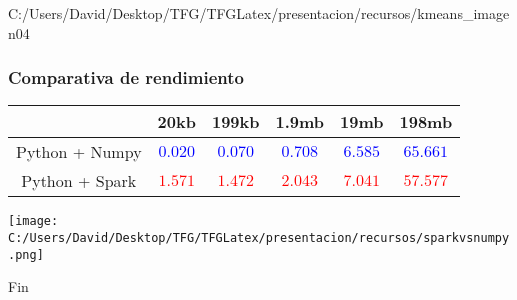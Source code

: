 \documentclass{beamer}
\begin{document}

\begin{frame} %
  {C:/Users/David/Desktop/TFG/TFGLatex/presentacion/recursos/kmeans_imagen}{0}{4}
\end{frame}


\begin{frame}[fragile] %
\frametitle{Comparativa de rendimiento}

\begin{table}[!htbp]\small
  \centering
  \begin{tabular}{|c|c|c|c|c|c|} %
    \hline
    & 20kb & 199kb & 1.9mb & 19mb & 198mb \\ \hline
    Python + Numpy & \textcolor{blue}{$0.020$} & \textcolor{blue}{$0.070$} & \textcolor{blue}{$0.708$} & \textcolor{blue}{$6.585$} & \textcolor{blue}{$65.661$} \\ \hline
    Python + Spark & \textcolor{red}{$1.571$} & \textcolor{red}{$1.472$} & \textcolor{red}{$2.043$} & \textcolor{red}{$7.041$} & \textcolor{red}{$57.577$} \\ \hline
  \end{tabular}
\end{table}

\centering
\texttt{[image: C:/Users/David/Desktop/TFG/TFGLatex/presentacion/recursos/sparkvsnumpy.png]}

\end{frame}


\begin{frame}
\Huge{\centerline{Fin}}
\end{frame}

\end{document}
